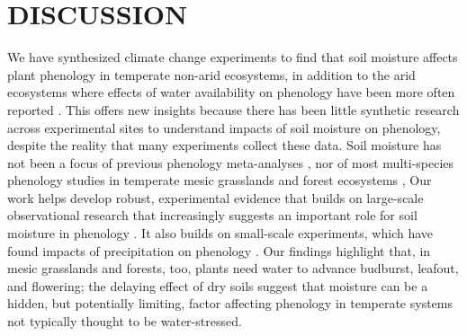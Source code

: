 \documentclass{article}
\begin{document}
\section* {DISCUSSION}
\par We have synthesized climate change experiments to find that soil moisture affects plant phenology in temperate non-arid ecosystems, in addition to the arid ecosystems where effects of water availability on phenology have been more often reported \cite[e.g.,][]{reich1984,van1993,cleverly2016soil,bertiller1991seasonal}. This offers new insights because there has been little synthetic research across experimental sites to understand impacts of soil moisture on phenology, despite the reality that many experiments collect these data. Soil moisture has not been a focus of previous phenology meta-analyses \cite[e.g.,][]{wolkovich2012}, nor of most multi-species phenology studies in temperate mesic grasslands and forest ecosystems \cite[e.g.,][]{Vitass2021}, Our work helps develop robust, experimental evidence that builds on large-scale observational research that increasingly suggests an important role for soil moisture in phenology \cite[e.g.,][]{}. It also builds on small-scale experiments, which have found impacts of precipitation on phenology \cite[e.g.,][]{currier2022precipitation}. Our findings highlight that, in mesic grasslands and forests, too, plants need water to advance budburst, leafout, and flowering; the delaying effect of dry soils suggest that moisture can be a hidden, but potentially limiting, factor affecting phenology in temperate systems not typically thought to be water-stressed. 
\end{document}
